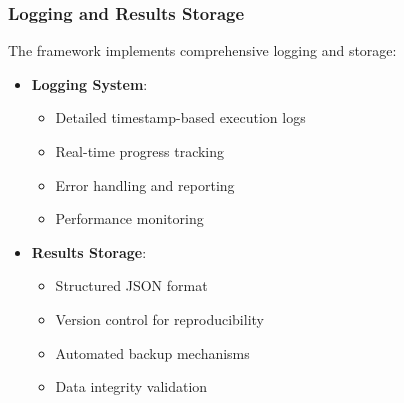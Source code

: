 \subsubsection{Logging and Results Storage}
The framework implements comprehensive logging and storage:
\begin{itemize}
    \item \textbf{Logging System}:
    \begin{itemize}
        \item Detailed timestamp-based execution logs
        \item Real-time progress tracking
        \item Error handling and reporting
        \item Performance monitoring
    \end{itemize}

    \item \textbf{Results Storage}:
    \begin{itemize}
        \item Structured JSON format
        \item Version control for reproducibility
        \item Automated backup mechanisms
        \item Data integrity validation
    \end{itemize}
\end{itemize}

